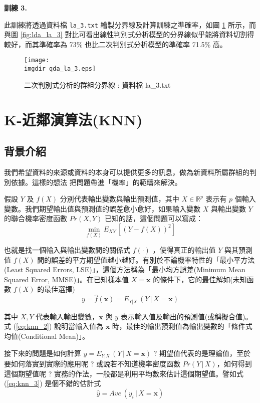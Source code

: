 \textbf{\large 訓練 3.}

此訓練將透過資料檔 \verb|la_3.txt| 繪製分界線及計算訓練之準確率，如圖 \ref{fig:qda_la_3} 所示，而與圖 \ref{fig:lda_la_3} 對比可看出線性判別式分析模型的分界線似乎能將資料切割得較好，而其準確率為 73\% 也比二次判別式分析模型的準確率 71.5\% 高。

\begin{figure}[H]
    \centering
        \texttt{[image: \\imgdir qda\_la\_3.eps]}
    \caption{二次判別式分析的群組分界線 : 資料檔 la\_3.txt}
    \label{fig:qda_la_3}
\end{figure}
\section{K-近鄰演算法(KNN)}
\subsection{背景介紹}
我們希望資料的來源或資料的本身可以提供更多的訊息，做為新資料所屬群組的判別依據。這樣的想法
把問題帶進「機率」的範疇來解決。

假設 $Y$ 及 $f(X)$ 分別代表輸出變數與輸出預測值，其中 $X \in \mathbb{R}^p$ 表示有 $p$ 個輸入變數。我們期望輸出值與預測值的誤差愈小愈好，如果輸入變數 $X$ 與輸出變數 $Y$ 的聯合機率密度函數 $Pr(X, Y)$ 已知的話，這個問題可以寫成：
\begin{equation}\label{eq:knn_1}
\mathop{\text{min}} \limits_{f(X)} E_{XY}\,[(Y - f(X))^2]
\end{equation}

也就是找一個輸入與輸出變數間的關係式 $f(·)$ ，使得真正的輸出值 $Y$ 與其預測值 $f(X)$ 間的誤差的平方期望值越小越好。有別於不論機率特性的「最小平方法(Least Squared Errors, LSE)」，這個方法稱為「最小均方誤差(Minimum Mean Squared Error, MMSE)」。在已知樣本值 $X = \mathbf{x}$ 的條件下，它的最佳解如(未知函數 $f(X)$ 的最佳選擇)
\begin{equation}\label{eq:knn_2}
y = \hat{f}(\mathbf{x}) = E_{Y|X}\,(Y\,|\,X = \mathbf{x})
\end{equation}

其中 $X, Y$ 代表輸入輸出變數，$\mathbf{x}$ 與 $y$ 表示輸入值及輸出的預測值(或稱擬合值)。式 (\ref{eq:knn_2}) 說明當輸入值為 $\mathbf{x}$ 時，最佳的輸出預測值為輸出變數的「條件式均值(Conditional Mean)」。

接下來的問題是如何計算 $y = E_{Y|X}\,(Y\,|\,X = \mathbf{x})$ ? 期望值代表的是理論值，至於要如何落實到實際的應用呢 ? 或說若不知道機率密度函數 $Pr(Y\,|\,X)$，如何得到這個期望值呢 ? 實務的作法，一般都是利用平均數來估計這個期望值。譬如式 (\ref{eq:knn_3}) 是個不錯的估計式
\begin{equation}\label{eq:knn_3}
\hat{y} = Ave\,(y_i\,|\,X = \mathbf{x})
\end{equation}

